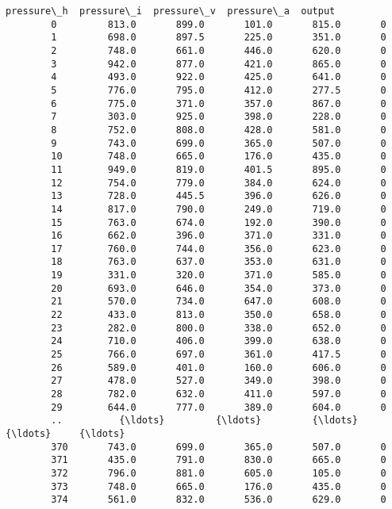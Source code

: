 \documentclass[11pt]{article}
\begin{document}
\begin{Verbatim}[commandchars=\\\{\}]
             pressure\_h  pressure\_i  pressure\_v  pressure\_a  output  
        0         813.0       899.0       101.0       815.0       0  
        1         698.0       897.5       225.0       351.0       0  
        2         748.0       661.0       446.0       620.0       0  
        3         942.0       877.0       421.0       865.0       0  
        4         493.0       922.0       425.0       641.0       0  
        5         776.0       795.0       412.0       277.5       0  
        6         775.0       371.0       357.0       867.0       0  
        7         303.0       925.0       398.0       228.0       0  
        8         752.0       808.0       428.0       581.0       0  
        9         743.0       699.0       365.0       507.0       0  
        10        748.0       665.0       176.0       435.0       0  
        11        949.0       819.0       401.5       895.0       0  
        12        754.0       779.0       384.0       624.0       0  
        13        728.0       445.5       396.0       626.0       0  
        14        817.0       790.0       249.0       719.0       0  
        15        763.0       674.0       192.0       390.0       0  
        16        662.0       396.0       371.0       331.0       0  
        17        760.0       744.0       356.0       623.0       0  
        18        763.0       637.0       353.0       631.0       0  
        19        331.0       320.0       371.0       585.0       0  
        20        693.0       646.0       354.0       373.0       0  
        21        570.0       734.0       647.0       608.0       0  
        22        433.0       813.0       350.0       658.0       0  
        23        282.0       800.0       338.0       652.0       0  
        24        710.0       406.0       399.0       638.0       0  
        25        766.0       697.0       361.0       417.5       0  
        26        589.0       401.0       160.0       606.0       0  
        27        478.0       527.0       349.0       398.0       0  
        28        782.0       632.0       411.0       597.0       0  
        29        644.0       777.0       389.0       604.0       0  
        ..          {\ldots}         {\ldots}         {\ldots}         {\ldots}     {\ldots}  
        370       743.0       699.0       365.0       507.0       0  
        371       435.0       791.0       830.0       665.0       0  
        372       796.0       881.0       605.0       105.0       0  
        373       748.0       665.0       176.0       435.0       0  
        374       561.0       832.0       536.0       629.0       0  

\end{Verbatim}
\end{document}
